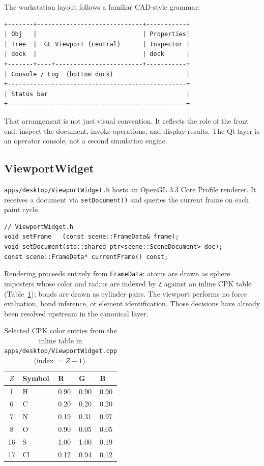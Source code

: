 ﻿\documentclass[11pt]{article}
\newcommand{\file}[1]{\texttt{#1}}
\newcommand{\type}[1]{\texttt{#1}}
\newcommand{\field}[1]{\texttt{#1}}
\newcommand{\op}[1]{\texttt{#1}}
\begin{document}
The workstation layout follows a familiar CAD-style grammar:

\begin{verbatim}
+-------+-----------------------------+-----------+
| Obj   |                             | Properties|
| Tree  |  GL Viewport (central)      | Inspector |
| dock  |                             | dock      |
+-------+----+------------------------+-----------+
| Console / Log  (bottom dock)                    |
+-------------------------------------------------+
| Status bar                                      |
+-------------------------------------------------+
\end{verbatim}

That arrangement is not just visual convention. It reflects the role of the
front end: inspect the document, invoke operations, and display results. The
Qt layer is an operator console, not a second simulation engine.

\subsection{ViewportWidget}

\file{apps/desktop/ViewportWidget.h} hosts an OpenGL 3.3 Core Profile
renderer. It receives a document via \op{setDocument()} and queries the
current frame on each paint cycle.

\begin{lstlisting}
// ViewportWidget.h
void setFrame   (const scene::FrameData& frame);
void setDocument(std::shared_ptr<scene::SceneDocument> doc);
const scene::FrameData* currentFrame() const;
\end{lstlisting}

Rendering proceeds entirely from \type{FrameData}: atoms are drawn as sphere
imposters whose color and radius are indexed by \field{Z} against an inline
CPK table (Table~\ref{tab:cpk}); bonds are drawn as cylinder pairs. The
viewport performs no force evaluation, bond inference, or element
identification. Those decisions have already been resolved upstream in the
canonical layer.

\begin{table}[ht]
\centering
\caption{Selected CPK color entries from the inline table in
\file{apps/desktop/ViewportWidget.cpp} (index $= Z - 1$).}
\label{tab:cpk}
\begin{tabular}{cllll}
\toprule
$Z$ & Symbol & R & G & B \\
\midrule
1  & H  & 0.90 & 0.90 & 0.90 \\
6  & C  & 0.20 & 0.20 & 0.20 \\
7  & N  & 0.19 & 0.31 & 0.97 \\
8  & O  & 0.90 & 0.05 & 0.05 \\
16 & S  & 1.00 & 1.00 & 0.19 \\
17 & Cl & 0.12 & 0.94 & 0.12 \\
\bottomrule
\end{tabular}
\end{table}
\end{document}
